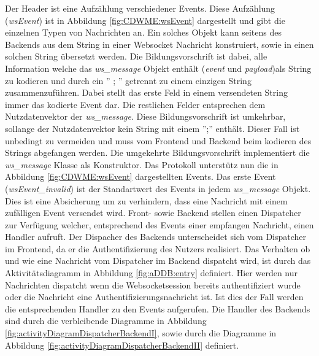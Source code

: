 Der Header ist eine Aufzählung verschiedener Events. 
Diese Aufzählung (\emph{wsEvent}) ist in Abbildung \ref{fig:CDWME:wsEvent} dargestellt und gibt die einzelnen Typen von Nachrichten an. 
Ein solches Objekt kann seitens des Backends aus dem String in einer Websocket Nachricht konstruiert, 
sowie in einen solchen String übersetzt werden. 
Die Bildungsvorschrift ist dabei, alle Information welche das \emph{ws\_message} Objekt enthält (\emph{event} und \emph{payload})als String zu kodieren 
und durch ein '' ; '' getrennt zu einem einzigen String zusammenzuführen.
Dabei stellt das erste Feld in einem versendeten String immer das kodierte Event dar. Die restlichen Felder entsprechen dem Nutzdatenvektor der \emph{ws\_message}.
Diese Bildungsvorschrift ist umkehrbar, sollange der Nutzdatenvektor kein String mit einem '';'' enthält.
Dieser Fall ist unbedingt zu vermeiden und muss vom Frontend und Backend beim kodieren des Strings abgefangen werden.
Die umgekehrte Bildungsvorschrift implementiert die \emph{ws\_message} Klasse als Konstruktor. 
Das Protokoll unterstütz nun die in Abbildung \ref{fig:CDWME:wsEvent} dargestellten Events.
Das erste Event (\emph{wsEvent\_invalid}) ist der Standartwert des Events in jedem \emph{ws\_message} Objekt. 
Dies ist eine Absicherung um zu verhindern, dass eine Nachricht mit einem zufälligen Event versendet wird.
Front- sowie Backend stellen einen Dispatcher zur Verfügung welcher, entsprechend des Events einer empfangen Nachricht, einen Handler aufruft.
Der Dispacher des Backends unterscheidet sich vom Dispatcher im Frontend, da er die Authentifizierung des Nutzers realisiert.
Das Verhalten ob und wie eine Nachricht vom Dispatcher im Backend dispatcht wird, 
ist durch das Aktivitätsdiagramm in Abbildung \ref{fig:aDDB:entry} definiert. 
Hier werden nur Nachrichten dispatcht wenn die Websocketsession bereits authentifiziert wurde oder die Nachricht eine Authentifizierungsnachricht ist.
Ist dies der Fall werden die entsprechenden Handler zu den Events aufgerufen. 
Die Handler des Backends sind durch die verbleibende Diagramme in Abbildung \ref{fig:activityDiagramDispatcherBackendI}, 
sowie durch die Diagramme in Abbildung \ref{fig:activityDiagramDispatcherBackendII} definiert.

